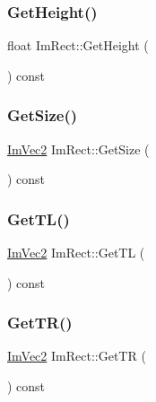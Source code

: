 \hypertarget{struct_im_rect_a748d8ae9cb26508951ec6e2f2df0625b}{}\label{struct_im_rect_a748d8ae9cb26508951ec6e2f2df0625b} 
\subsubsection{\texorpdfstring{Get\+Height()}{GetHeight()}}
{\footnotesize\ttfamily float Im\+Rect\+::\+Get\+Height (\begin{DoxyParamCaption}{ }\end{DoxyParamCaption}) const}

\hypertarget{struct_im_rect_ae459d9c50003058cfb34519a571aaf33}{}\label{struct_im_rect_ae459d9c50003058cfb34519a571aaf33} 
\subsubsection{\texorpdfstring{Get\+Size()}{GetSize()}}
{\footnotesize\ttfamily \hyperlink{struct_im_vec2}{Im\+Vec2} Im\+Rect\+::\+Get\+Size (\begin{DoxyParamCaption}{ }\end{DoxyParamCaption}) const}

\hypertarget{struct_im_rect_a1d4d972329722b51dca4499cb5931b4b}{}\label{struct_im_rect_a1d4d972329722b51dca4499cb5931b4b} 
\subsubsection{\texorpdfstring{Get\+T\+L()}{GetTL()}}
{\footnotesize\ttfamily \hyperlink{struct_im_vec2}{Im\+Vec2} Im\+Rect\+::\+Get\+TL (\begin{DoxyParamCaption}{ }\end{DoxyParamCaption}) const}

\hypertarget{struct_im_rect_acae90248a96be4acf1524071fca1c3f3}{}\label{struct_im_rect_acae90248a96be4acf1524071fca1c3f3} 
\subsubsection{\texorpdfstring{Get\+T\+R()}{GetTR()}}
{\footnotesize\ttfamily \hyperlink{struct_im_vec2}{Im\+Vec2} Im\+Rect\+::\+Get\+TR (\begin{DoxyParamCaption}{ }\end{DoxyParamCaption}) const}


